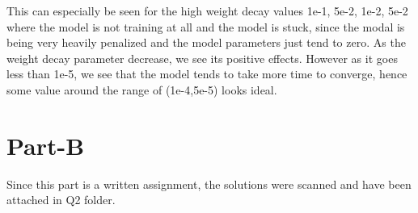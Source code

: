 \documentclass{article}
\begin{document}
\noindent
This can especially be seen for the high weight decay values 1e-1, 5e-2, 1e-2, 5e-2 where the model is not training at all and the model is stuck, since the modal is being very heavily penalized and the model parameters just tend to zero. As the weight decay parameter decrease, we see its positive effects. However as it goes less than 1e-5, we see that the model tends to take more time to converge, hence some value around the range of (1e-4,5e-5) looks ideal.

\section{Part-B}

Since this part is a written assignment, the solutions were scanned and have been attached in Q2 folder.
\end{document}
